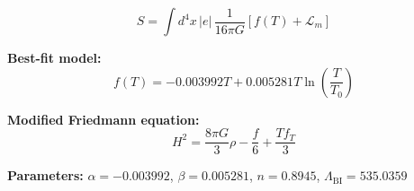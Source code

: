 
\begin{equation}
  S = \int d^4x \, |e| \, \frac{1}{16\pi G} \left[ f(T) + \mathcal{L}_m \right]
\end{equation}

\textbf{Best-fit model:}
\begin{equation}
  f(T) = -0.003992 T + 0.005281 T \ln\!\left(\frac{T}{T_0}\right)
\end{equation}

\textbf{Modified Friedmann equation:}
\begin{equation}
  H^2 = \frac{8\pi G}{3} \rho - \frac{f}{6} + \frac{T f_T}{3}
\end{equation}

\textbf{Parameters:}
$\alpha = -0.003992$, \quad
$\beta = 0.005281$, \quad
$n = 0.8945$, \quad
$\Lambda_{\text{BI}} = 535.0359$